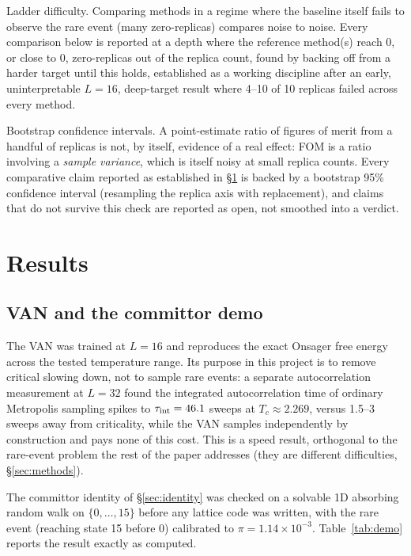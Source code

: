 \documentclass[11pt]{article}
\begin{document}
	Ladder difficulty. Comparing methods in a regime where the baseline itself fails
	to observe the rare event (many zero-replicas) compares noise to noise. Every comparison
	below is reported at a depth where the reference method(s) reach 0, or close to 0,
	zero-replicas out of the replica count, found by backing off from a harder target until
	this holds, established as a working discipline after an early, uninterpretable
	$L=16$, deep-target result where 4--10 of 10 replicas failed across every method.
	
	Bootstrap confidence intervals. A point-estimate ratio of figures of merit from a
	handful of replicas is not, by itself, evidence of a real effect: FOM is a ratio
	involving a \emph{sample variance}, which is itself noisy at small replica counts. Every
	comparative claim reported as established in \S\ref{sec:results} is backed by a bootstrap
	95\% confidence interval (resampling the replica axis with replacement), and claims that do
	not survive this check are reported as open, not smoothed into a verdict.
	
	\section{Results}
	\label{sec:results}
	
	\subsection{VAN and the committor demo}
	\label{sec:res-van}
	The VAN was trained at $L=16$ and reproduces the exact Onsager free energy across the
	tested temperature range. Its purpose in this project is to remove critical slowing down,
	not to sample rare events: a separate autocorrelation measurement at $L=32$ found the
	integrated autocorrelation time of ordinary Metropolis sampling spikes to $\tau_{\rm
		int}=46.1$ sweeps at $T_c\approx2.269$, versus 1.5--3 sweeps away from criticality, while
	the VAN samples independently by construction and pays none of this cost. This is a speed
	result, orthogonal to the rare-event problem the rest of the paper addresses (they are
	different difficulties, \S\ref{sec:methods}).
	
	The committor identity of \S\ref{sec:identity} was checked on a solvable 1D absorbing
	random walk on $\{0,\dots,15\}$ before any lattice code was written, with the rare event
	(reaching state 15 before 0) calibrated to $\pi=1.14\times10^{-3}$. Table~\ref{tab:demo}
	reports the result exactly as computed.
	
\end{document}
